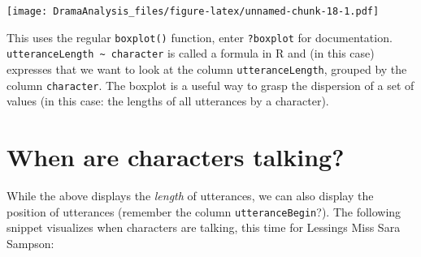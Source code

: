 \documentclass[]{book}
\newenvironment{Shaded}{\begin{snugshade}}{\end{snugshade}}
\newcommand{\CommentTok}[1]{\textcolor[rgb]{0.56,0.35,0.01}{\textit{#1}}}
\newcommand{\DataTypeTok}[1]{\textcolor[rgb]{0.13,0.29,0.53}{#1}}
\newcommand{\DecValTok}[1]{\textcolor[rgb]{0.00,0.00,0.81}{#1}}
\newcommand{\FloatTok}[1]{\textcolor[rgb]{0.00,0.00,0.81}{#1}}
\newcommand{\KeywordTok}[1]{\textcolor[rgb]{0.13,0.29,0.53}{\textbf{#1}}}
\newcommand{\NormalTok}[1]{#1}
\newcommand{\OperatorTok}[1]{\textcolor[rgb]{0.81,0.36,0.00}{\textbf{#1}}}
\newcommand{\StringTok}[1]{\textcolor[rgb]{0.31,0.60,0.02}{#1}}
\begin{document}
\begin{Shaded}
\end{Shaded}

\texttt{[image: DramaAnalysis\_files/figure-latex/unnamed-chunk-18-1.pdf]}

This uses the regular \texttt{boxplot()} function, enter \texttt{?boxplot} for documentation. \texttt{utteranceLength\ \textasciitilde{}\ character} is called a formula in R and (in this case) expresses that we want to look at the column \texttt{utteranceLength}, grouped by the column \texttt{character}. The boxplot is a useful way to grasp the dispersion of a set of values (in this case: the lengths of all utterances by a character).

\hypertarget{when-are-characters-talking}{%
\section{When are characters talking?}\label{when-are-characters-talking}}

While the above displays the \emph{length} of utterances, we can also display the position of utterances (remember the column \texttt{utteranceBegin}?). The following snippet visualizes when characters are talking, this time for Lessings Miss Sara Sampson:
\end{document}
